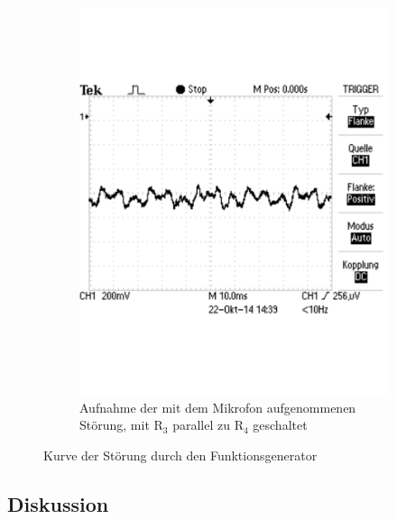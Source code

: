 \documentclass[12pt,a4paper]{article}
\begin{document}
\begin{figure}[H]
\begin{subfigure}[b]{0.48\textwidth}
                \includegraphics[width=\textwidth , scale = 0.4]{2_3_r3p_st.pdf}
                \caption[Aufnahme der mit dem Mikrofon aufgenommenen Störung, mit R$_3$ parallel zu R$_4$ geschaltet]{Aufnahme der mit dem Mikrofon aufgenommenen Störung, mit R$_3$ parallel zu R$_4$ geschaltet}
  				\label{fig:2_3_r3p_st}
        \end{subfigure}
        \caption{Kurve der Störung durch den Funktionsgenerator}
        \label{fig:2_2_stoer_vergleich}
\end{figure}



\subsection{Diskussion}
\end{document}
